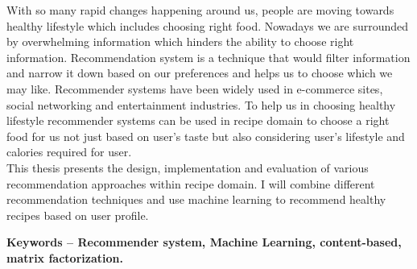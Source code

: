 



\vspace{1mm}

\normalsize
\noindent With so many rapid changes happening around us, people are moving towards healthy lifestyle which includes choosing right food. Nowadays we are surrounded by overwhelming information which hinders the ability to choose right information. Recommendation system is a technique that would filter information and narrow it down based on our preferences and helps us to choose which we may like.  Recommender systems have been widely used in e-commerce sites, social networking and entertainment industries. To help us in choosing healthy lifestyle recommender systems can be used in recipe domain to choose a right food for us not just based on user's taste but also considering user's lifestyle and calories required for user.  
\\
This thesis presents the design, implementation and evaluation of various recommendation approaches within recipe domain. I will combine different recommendation techniques and use machine learning to recommend healthy recipes based on user profile.

\vspace*{\fill}
\noindent \textbf{Keywords – Recommender system, Machine Learning, content-based, matrix factorization.}




